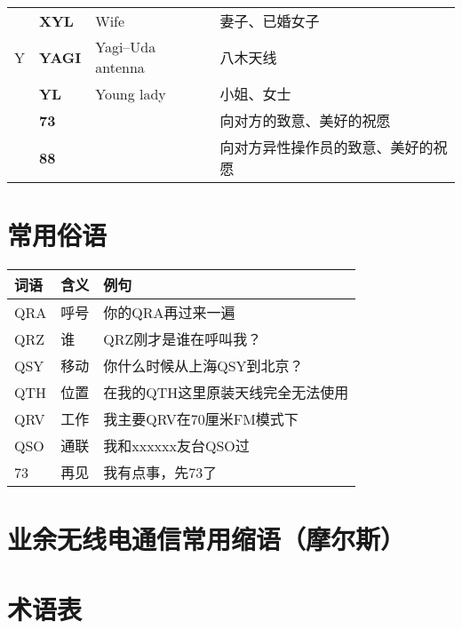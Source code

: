 \begin{longtable}[l]{llll}
    & \textbf{XYL}                      & Wife                                    & 妻子、已婚女子             \\
  Y & \textbf{YAGI}                     & Yagi–Uda antenna                        & 八木天线                \\
    & \textbf{YL}                       & Young lady                              & 小姐、女士               \\
    & \textbf{73}                       &                                         & 向对方的致意、美好的祝愿        \\
    & \textbf{88}                       &                                         & 向对方异性操作员的致意、美好的祝愿   \\
\end{longtable}

\newpage

\section{常用俗语}

\begin{longtable}{|l|l|l|}
  \hline
  \textbf{词语} & \textbf{含义} & \textbf{例句}        \\
  \hline
  QRA         & 呼号          & 你的QRA再过来一遍         \\
  \hline
  QRZ         & 谁           & QRZ刚才是谁在呼叫我？       \\
  \hline
  QSY         & 移动          & 你什么时候从上海QSY到北京？    \\
  \hline
  QTH         & 位置          & 在我的QTH这里原装天线完全无法使用 \\
  \hline
  QRV         & 工作          & 我主要QRV在70厘米FM模式下   \\
  \hline
  QSO         & 通联          & 我和xxxxxx友台QSO过     \\
  \hline
  73          & 再见          & 我有点事，先73了          \\
  \hline
\end{longtable}

\newpage

\section{业余无线电通信常用缩语（摩尔斯）}

\newpage

\section{术语表}

